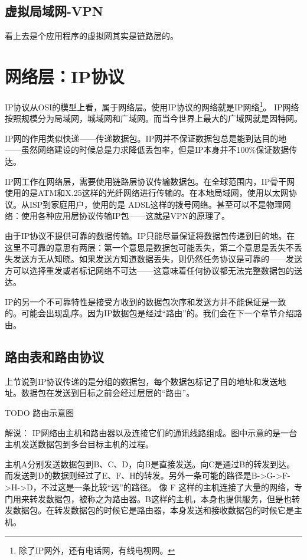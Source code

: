 
\subsection{虚拟局域网-VPN}

看上去是个应用程序的虚拟网其实是链路层的。

\section{网络层：IP协议}

IP协议从OSI的模型上看，属于网络层。使用IP协议的网络就是IP网络\footnote{除了IP网外，还有电话网，有线电视网。}。
IP网络按照规模分为局域网，城域网和广域网。而当今世界上最大的广域网就是因特网。

IP网的作用类似快递——传递数据包。IP网并不保证数据包总是能到达目的地——虽然网络建设的时候总是力求降低丢包率，但是IP本身并不100\%保证数据传达。

IP网工作在网络层，需要使用链路层协议传输数据包。在全球范围内，IP骨干网使用的是ATM和X.25这样的光纤网络进行传输的。在本地局域网，使用以太网协议。从ISP到家庭用户，使用的是
ADSL这样的拨号网络。甚至可以不是物理网络：使用各种应用层协议传输IP包——这就是VPN的原理了。

由于IP协议不提供可靠的数据传输。IP只能尽量保证将数据包传递到目的地。在这里不可靠的意思有两层：第一个意思是数据包可能丢失，第二个意思是丢失不丢失发送方无从知晓。如果发送方知道数据丢失，则仍然任务协议是可靠的——发送方可以选择重发或者标记网络不可达——这意味着任何协议都无法完整数据包的送达。

IP的另一个不可靠特性是接受方收到的数据包次序和发送方并不能保证是一致的。可能会出现乱序。因为IP数据包是经过“路由”的。我们会在下一个章节介绍路由。

\subsection{路由表和路由协议}

上节说到IP协议传递的是分组的数据包，每个数据包标记了目的地址和发送地址。数据包在发送到目标之前会经过层层的“路由”。

TODO 路由示意图

解说： IP网络由主机和路由器以及连接它们的通讯线路组成。图中示意的是一台主机发送数据包到多台目标主机的过程。

主机A分别发送数据包到B、C、D，向B是直接发送。向C是通过B的转发到达。而发送到D的数据则经过了E、F、H的转发。另外一条可能的路径是B->G->F->H->D，不过这是一条比较“远”的路径。
像 F 这样的主机连接了大量的网络，专门用来转发数据包，被称之为路由器。B这样的主机，本身也提供服务，但是也转发数据包。在转发数据包的时候它是路由器，本身发送和接收数据包的时候它是主机。

